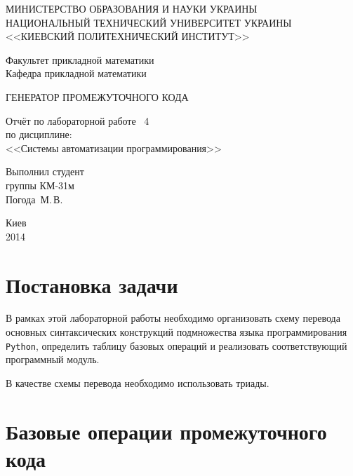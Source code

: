 \documentclass[a4paper,12pt,notitlepage,pdftex]{scrreprt}
\begin{document}
\begin{titlepage}
    \begin{center}
        \MakeUppercase{Министерство образования и науки Украины}\\
        \MakeUppercase{Национальный технический университет Украины}\\
        \MakeUppercase{<<Киевский политехнический институт>>}\\
        \vspace*{2em}

        Факультет прикладной математики\\
        Кафедра прикладной математики

        \vfill

        \MakeUppercase{Генератор промежуточного кода}\\
        \vspace*{2em}

        Отчёт по лабораторной работе \textnumero~4\\
        по дисциплине:\\
        <<Системы автоматизации программирования>>
    \end{center}

    \vfill
    \hfill\begin{minipage}{0.3\textwidth}
        Выполнил студент\\
        группы КМ-31м\\
        Погода~М.\,В.
    \end{minipage}

    \vfill
    \begin{center}
        Киев\\
        2014
    \end{center}
\end{titlepage}

\tableofcontents

\chapter{Постановка задачи}
\label{chap:first}
    В рамках этой лабораторной работы необходимо организовать схему перевода основных синтаксических конструкций
    подмножества языка программирования \texttt{Python}, определить таблицу базовых операций и реализовать
    соответствующий программный модуль.

    В качестве схемы перевода необходимо использовать триады.
\chapter{Базовые операции промежуточного кода}
\label{chap:second}
\end{document}
